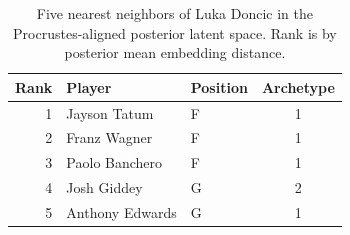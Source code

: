 \begin{table}[htbp]
  \centering\small
  \begin{tabular}{rllc}
    \toprule
    Rank & Player & Position & Archetype \\
    \midrule
    1 & Jayson Tatum & F & 1 \\
    2 & Franz Wagner & F & 1 \\
    3 & Paolo Banchero & F & 1 \\
    4 & Josh Giddey & G & 2 \\
    5 & Anthony Edwards & G & 1 \\
    \bottomrule
  \end{tabular}
  \caption{Five nearest neighbors of Luka Doncic in the Procrustes-aligned posterior latent space. Rank is by posterior mean embedding distance.}
  \label{tab:Luka_Doncic_neighbors}
\end{table}


